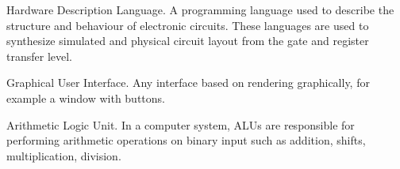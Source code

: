 \begin{definition}[HDL]
    Hardware Description Language. A programming language used to describe the structure and behaviour of electronic circuits. These languages are used to synthesize simulated and physical circuit layout from the gate and register transfer level\cite{Chu2006}.
\end{definition}

\begin{definition}[GUI]
    Graphical User Interface. Any interface based on rendering graphically, for example a window with buttons. 
\end{definition}

\begin{definition}[ALU]
    Arithmetic Logic Unit. In a computer system, ALUs are responsible for performing arithmetic operations on binary input such as addition, shifts, multiplication, division.
\end{definition}